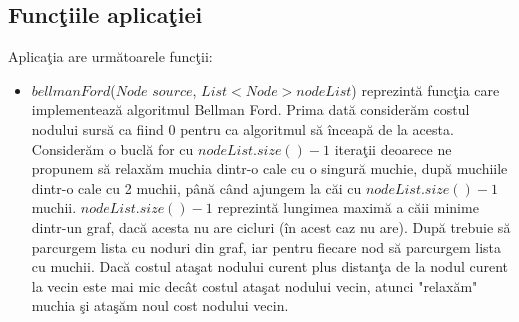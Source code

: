 \documentclass{article}
\begin{document}
\subsection{Func\c{t}iile aplica\c{t}iei}
Aplica\c{t}ia are urm\u{a}toarele func\c{t}ii:
\begin{itemize}
    \item $bellmanFord$($Node$ $source$, $List<Node> nodeList$) reprezint\u{a} func\c{t}ia care implementeaz\u{a} algoritmul Bellman Ford. Prima dat\u{a} consider\u{a}m costul nodului surs\u{a} ca fiind 0 pentru ca algoritmul s\u{a} \^{i}nceap\u{a} de la acesta. Consider\u{a}m o bucl\u{a} for cu $nodeList.size() - 1$ itera\c{t}ii deoarece ne propunem s\u{a} relax\u{a}m muchia dintr-o cale cu o singur\u{a} muchie, dup\u{a} muchiile dintr-o cale cu 2 muchii, p\^{a}n\u{a} c\^{a}nd ajungem la c\u{a}i cu $nodeList.size() - 1$ muchii. $nodeList.size() - 1$ reprezint\u{a} lungimea maxim\u{a} a c\u{a}ii minime dintr-un graf, dac\u{a} acesta nu are cicluri (\^{i}n acest caz nu are). Dup\u{a} trebuie s\u{a} parcurgem lista cu noduri din graf, iar pentru fiecare nod s\u{a} parcurgem lista cu muchii. Dac\u{a} costul ata\c{s}at nodului curent plus distan\c{t}a de la nodul curent la vecin este mai mic dec\^{a}t costul ata\c{s}at nodului vecin, atunci "relax\u{a}m" muchia \c{s}i ata\c{s}\u{a}m noul cost nodului vecin.

\end{itemize}
\end{document}
